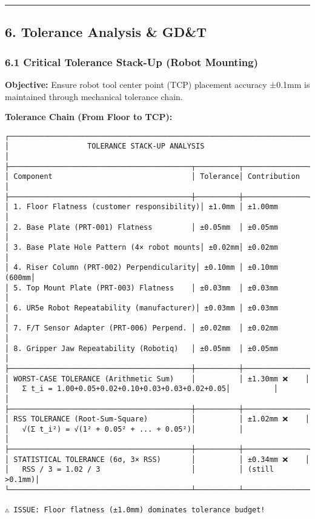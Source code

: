 \documentclass[
]{article}
\begin{document}
\begin{center}\rule{0.5\linewidth}{0.5pt}\end{center}

\hypertarget{tolerance-analysis-gdt}{%
\subsection{6. Tolerance Analysis \&
GD\&T}\label{tolerance-analysis-gdt}}

\hypertarget{critical-tolerance-stack-up-robot-mounting}{%
\subsubsection{6.1 Critical Tolerance Stack-Up (Robot
Mounting)}\label{critical-tolerance-stack-up-robot-mounting}}

\textbf{Objective:} Ensure robot tool center point (TCP) placement
accuracy ±0.1mm is maintained through mechanical tolerance chain.

\textbf{Tolerance Chain (From Floor to TCP):}

\begin{verbatim}
┌─────────────────────────────────────────────────────────────────────┐
│                  TOLERANCE STACK-UP ANALYSIS                        │
├──────────────────────────────────────────┬──────────┬───────────────┤
│ Component                                │ Tolerance│ Contribution  │
├──────────────────────────────────────────┼──────────┼───────────────┤
│ 1. Floor Flatness (customer responsibility)│ ±1.0mm │ ±1.00mm       │
│ 2. Base Plate (PRT-001) Flatness         │ ±0.05mm  │ ±0.05mm       │
│ 3. Base Plate Hole Pattern (4× robot mounts│ ±0.02mm│ ±0.02mm       │
│ 4. Riser Column (PRT-002) Perpendicularity│ ±0.10mm │ ±0.10mm (600mm│
│ 5. Top Mount Plate (PRT-003) Flatness    │ ±0.03mm  │ ±0.03mm       │
│ 6. UR5e Robot Repeatability (manufacturer)│ ±0.03mm │ ±0.03mm       │
│ 7. F/T Sensor Adapter (PRT-006) Perpend. │ ±0.02mm  │ ±0.02mm       │
│ 8. Gripper Jaw Repeatability (Robotiq)   │ ±0.05mm  │ ±0.05mm       │
├──────────────────────────────────────────┼──────────┼───────────────┤
│ WORST-CASE TOLERANCE (Arithmetic Sum)    │          │ ±1.30mm ❌    │
│   Σ t_i = 1.00+0.05+0.02+0.10+0.03+0.03+0.02+0.05│          │               │
├──────────────────────────────────────────┼──────────┼───────────────┤
│ RSS TOLERANCE (Root-Sum-Square)          │          │ ±1.02mm ❌    │
│   √(Σ t_i²) = √(1² + 0.05² + ... + 0.05²)│          │               │
├──────────────────────────────────────────┼──────────┼───────────────┤
│ STATISTICAL TOLERANCE (6σ, 3× RSS)       │          │ ±0.34mm ❌    │
│   RSS / 3 = 1.02 / 3                     │          │ (still >0.1mm)│
└──────────────────────────────────────────┴──────────┴───────────────┘

⚠️ ISSUE: Floor flatness (±1.0mm) dominates tolerance budget!
\end{verbatim}
\end{document}
